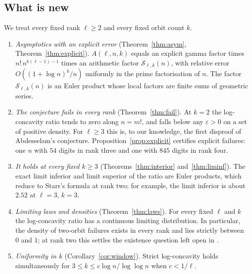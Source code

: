 \documentclass[11pt,a4paper]{article}
\theoremstyle{remark}
\numberwithin{equation}{section}
\newcommand{\Sing}{\mathcal S}
\begin{document}
\subsection{What is new}
We treat every fixed rank $\ell\ge2$ and every fixed orbit count $k$.
\begin{enumerate}
\item \emph{Asymptotics with an explicit error} (Theorem~\ref{thm:asym}, Theorem~\ref{thm:explicit}). $A(\ell,n,k)$ equals an explicit gamma factor times $n!\,n^{k(\ell-1)-1}$ times an arithmetic factor $\Sing_{\ell,k}(n)$, with relative error $O((1+\log n)^k/n)$ uniformly in the prime factorisation of $n$. The factor $\Sing_{\ell,k}(n)$ is an Euler product whose local factors are finite sums of geometric series.
\item \emph{The conjecture fails in every rank} (Theorem~\ref{thm:fail}). At $k=2$ the log-concavity ratio tends to zero along $n=m!$, and falls below any $\varepsilon>0$ on a set of positive density. For $\ell\ge3$ this is, to our knowledge, the first disproof of Abdesselam's conjecture. Proposition~\ref{prop:explicit} certifies explicit failures: one $n$ with $54$ digits in rank three and one with $845$ digits in rank four.
\item \emph{It holds at every fixed $k\ge3$} (Theorems~\ref{thm:interior} and~\ref{thm:liminf}). The exact limit inferior and limit superior of the ratio are Euler products, which reduce to Starr's formula at rank two; for example, the limit inferior is about $2.52$ at $\ell=3$, $k=3$.
\item \emph{Limiting laws and densities} (Theorem~\ref{thm:laws}). For every fixed $\ell$ and $k$ the log-concavity ratio has a continuous limiting distribution. In particular, the density of two-orbit failures exists in every rank and lies strictly between $0$ and $1$; at rank two this settles the existence question left open in \cite{CHS2026}.
\item \emph{Uniformity in $k$} (Corollary~\ref{cor:window}). Strict log-concavity holds simultaneously for $3\le k\le c\log n/\log\log n$ when $c<1/\ell$.
\end{enumerate}
\end{document}
